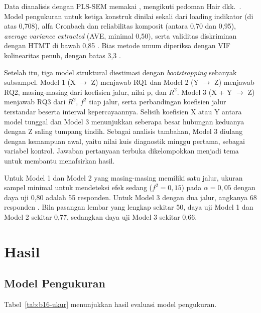 Data dianalisis dengan PLS-SEM memakai , mengikuti pedoman Hair dkk.~\cite{hair2019}. Model pengukuran untuk ketiga konstruk dinilai sekali dari loading indikator (di atas 0,708), alfa Cronbach \cite{cronbach1951} dan reliabilitas komposit (antara 0,70 dan 0,95), \textit{average variance extracted} (AVE, minimal 0,50), serta validitas diskriminan dengan HTMT di bawah 0,85 \cite{henseler2015}. Bias metode umum diperiksa dengan VIF kolinearitas penuh, dengan batas 3,3 \cite{kock2015}.

Setelah itu, tiga model struktural diestimasi dengan \textit{bootstrapping} sebanyak  subsampel. Model 1 (X $\rightarrow$ Z) menjawab RQ1 dan Model 2 (Y $\rightarrow$ Z) menjawab RQ2, masing-masing dari koefisien jalur, nilai p, dan $R^2$. Model 3 (X + Y $\rightarrow$ Z) menjawab RQ3 dari $R^2$, $f^2$ tiap jalur, serta perbandingan koefisien jalur terstandar beserta interval kepercayaannya. Selisih koefisien X atau Y antara model tunggal dan Model 3 menunjukkan seberapa besar hubungan keduanya dengan Z saling tumpang tindih. Sebagai analisis tambahan, Model 3 diulang dengan kemampuan awal, yaitu nilai kuis diagnostik minggu pertama, sebagai variabel kontrol. Jawaban pertanyaan terbuka dikelompokkan menjadi tema untuk membantu menafsirkan hasil.

Untuk Model 1 dan Model 2 yang masing-masing memiliki satu jalur, ukuran sampel minimal untuk mendeteksi efek sedang ($f^2 = 0{,}15$) pada $\alpha = 0{,}05$ dengan daya uji 0,80 adalah 55 responden. Untuk Model 3 dengan dua jalur, angkanya 68 responden \cite{cohen2013}. Bila pasangan lembar yang lengkap sekitar 50, daya uji Model 1 dan Model 2 sekitar 0,77, sedangkan daya uji Model 3 sekitar 0,66.

\section{Hasil}
\label{sec:b16-hasil}

\subsection{Model Pengukuran}

Tabel~\ref{tab:b16-ukur} menunjukkan hasil evaluasi model pengukuran. 

